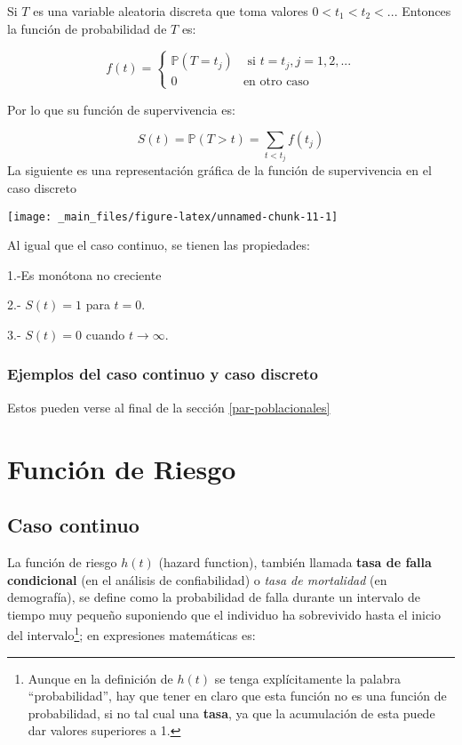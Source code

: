 \documentclass[
  a4paper,
  oneside,
  openany]{book}
\begin{document}
Si \(T\) es una variable aleatoria discreta que toma valores \(0<t_1<t_2<...\) Entonces la función de probabilidad de \(T\) es:

\[
f(t) = \left\{
\begin{array}{ll}
\mathbb{P}(T=t_j) & \mbox{ si  } t=t_j, j=1,2,...\\
0 & \mbox{en otro caso }
\end{array}
\right.
\]

Por lo que su función de supervivencia es:

\[
S(t)=\mathbb{P}(T> t)=\sum_{t< t_j}f(t_j)
\]
La siguiente es una representación gráfica de la función de supervivencia en el caso discreto

\begin{center}\texttt{[image: \_main\_files/figure-latex/unnamed-chunk-11-1]} \end{center}

Al igual que el caso continuo, se tienen las propiedades:

1.-Es monótona no creciente

2.- \(S(t)=1\) para \(t=0\).

3.- \(S(t)=0\) cuando \(t\rightarrow\infty\).

\hypertarget{ejemplos-del-caso-continuo-y-caso-discreto-1}{%
\subsubsection*{Ejemplos del caso continuo y caso discreto}\label{ejemplos-del-caso-continuo-y-caso-discreto-1}}


Estos pueden verse al final de la sección \ref{par-poblacionales}

\hypertarget{RiskFunction}{%
\section{Función de Riesgo}\label{RiskFunction}}

\hypertarget{caso-continuo-1}{%
\subsection*{Caso continuo}\label{caso-continuo-1}}


La función de riesgo \(h(t)\) (hazard function), también llamada \textbf{tasa de falla condicional} (en el análisis de confiabilidad) o \emph{tasa de mortalidad} (en demografía), se define como la probabilidad de falla durante un intervalo de tiempo muy pequeño suponiendo que el individuo ha sobrevivido hasta el inicio del intervalo\footnote{Aunque en la definición de \(h(t)\) se tenga explícitamente la palabra ``probabilidad'', hay que tener en claro que esta función no es una función de probabilidad, si no tal cual una \textbf{tasa}, ya que la acumulación de esta puede dar valores superiores a 1.}; en expresiones matemáticas es:
\end{document}

